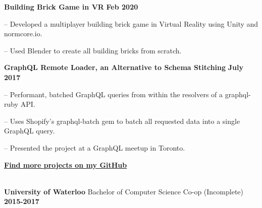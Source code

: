 \documentclass[12pt]{extarticle}
\begin{document}
{    \vspace{-0.2cm}
    {\indent
        \textbf{Building Brick Game in VR} \hfill \textbf{Feb 2020}

        \begin{compactitem}
            \setlength{\itemindent}{0.5cm}
            \item[--] Developed a multiplayer building brick game in Virtual Reality using Unity and normcore.io.
            \item[--] Used Blender to create all building bricks from scratch.
        \end{compactitem}
    }

     \vspace{0.3cm}
     
    {\indent
        \textbf{GraphQL Remote Loader, an Alternative to Schema Stitching} \hfill \textbf{July 2017}

        \begin{compactitem}
            \setlength{\itemindent}{0.5cm}
            \item[--] Performant, batched GraphQL queries from within the resolvers of a graphql-ruby API.
            \item[--] Uses Shopify's graphql-batch gem to batch all requested data into a single GraphQL query.
            \item[--] Presented the project at a GraphQL meetup in Toronto.
        \end{compactitem}
    }

    \vspace{0.3cm}
    \noindent
    {\indent
        \href{https://github.com/d12}{\textbf{Find more projects on my GitHub}}
    }

    \vspace{0.8cm}
    \\

    \vspace{-0.2cm}
    {\indent
        \textbf{University of Waterloo} Bachelor of Computer Science Co-op (Incomplete) \hfill \textbf{2015-2017}
    }
}
\end{document}
